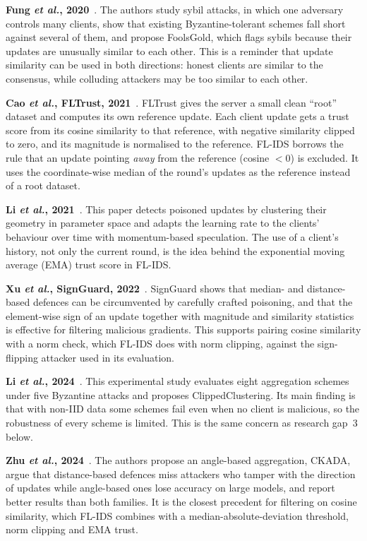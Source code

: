 \textbf{Fung \emph{et al.}, 2020}~\cite{fung2020}. The authors study sybil attacks, in which one adversary controls many clients, show that existing Byzantine-tolerant schemes fall short against several of them, and propose FoolsGold, which flags sybils because their updates are unusually similar to each other. This is a reminder that update similarity can be used in both directions: honest clients are similar to the consensus, while colluding attackers may be too similar to each other.

\textbf{Cao \emph{et al.}, FLTrust, 2021}~\cite{cao2021fltrust}. FLTrust gives the server a small clean ``root'' dataset and computes its own reference update. Each client update gets a trust score from its cosine similarity to that reference, with negative similarity clipped to zero, and its magnitude is normalised to the reference. FL-IDS borrows the rule that an update pointing \emph{away} from the reference (cosine $<0$) is excluded. It uses the coordinate-wise median of the round's updates as the reference instead of a root dataset.

\textbf{Li \emph{et al.}, 2021}~\cite{li2021spatial}. This paper detects poisoned updates by clustering their geometry in parameter space and adapts the learning rate to the clients' behaviour over time with momentum-based speculation. The use of a client's history, not only the current round, is the idea behind the exponential moving average (EMA) trust score in FL-IDS.

\textbf{Xu \emph{et al.}, SignGuard, 2022}~\cite{xu2022signguard}. SignGuard shows that median- and distance-based defences can be circumvented by carefully crafted poisoning, and that the element-wise sign of an update together with magnitude and similarity statistics is effective for filtering malicious gradients. This supports pairing cosine similarity with a norm check, which FL-IDS does with norm clipping, against the sign-flipping attacker used in its evaluation.

\textbf{Li \emph{et al.}, 2024}~\cite{li2024experimental}. This experimental study evaluates eight aggregation schemes under five Byzantine attacks and proposes ClippedClustering. Its main finding is that with non-IID data some schemes fail even when no client is malicious, so the robustness of every scheme is limited. This is the same concern as research gap~3 below.

\textbf{Zhu \emph{et al.}, 2024}~\cite{zhu2024cosine}. The authors propose an angle-based aggregation, CKADA, argue that distance-based defences miss attackers who tamper with the direction of updates while angle-based ones lose accuracy on large models, and report better results than both families. It is the closest precedent for filtering on cosine similarity, which FL-IDS combines with a median-absolute-deviation threshold, norm clipping and EMA trust.

